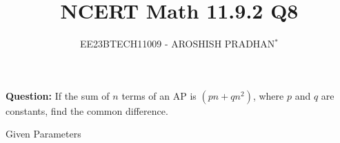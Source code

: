 \documentclass[journal,12pt,twocolumn]{IEEEtran}
\theoremstyle{remark}
\begin{document}

\vspace{3cm}

\title{NCERT Math 11.9.2 Q8}
\author{EE23BTECH11009 - AROSHISH PRADHAN$^{*}$%
}
\maketitle
\newpage
\bigskip
\textbf{Question:} If the sum of $n$ terms of an AP is $(pn + qn^2)$, where $p$ and $q$ are constants, find the common difference.

\solution
\fi
\begin{table}[!h]
    \centering
    
    \caption{Given Parameters}
    \label{tab:1_Math.11.9.2.8}
\end{table}
\end{document}
